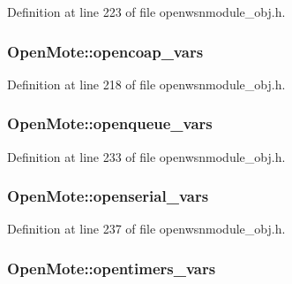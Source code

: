 Definition at line 223 of file openwsnmodule\+\_\+obj.\+h.

\subsubsection[{\texorpdfstring{opencoap\+\_\+vars}{opencoap_vars}}]{ Open\+Mote\+::opencoap\+\_\+vars}\hypertarget{struct_open_mote_ab5bab0ddb3925a9e553328506c80c6ce}{}\label{struct_open_mote_ab5bab0ddb3925a9e553328506c80c6ce}


Definition at line 218 of file openwsnmodule\+\_\+obj.\+h.

\subsubsection[{\texorpdfstring{openqueue\+\_\+vars}{openqueue_vars}}]{ Open\+Mote\+::openqueue\+\_\+vars}\hypertarget{struct_open_mote_a386f53172313c33476c0fb5de4daf54e}{}\label{struct_open_mote_a386f53172313c33476c0fb5de4daf54e}


Definition at line 233 of file openwsnmodule\+\_\+obj.\+h.

\subsubsection[{\texorpdfstring{openserial\+\_\+vars}{openserial_vars}}]{ Open\+Mote\+::openserial\+\_\+vars}\hypertarget{struct_open_mote_afd8c3a10c7a45dd24412299494f22dfd}{}\label{struct_open_mote_afd8c3a10c7a45dd24412299494f22dfd}


Definition at line 237 of file openwsnmodule\+\_\+obj.\+h.

\subsubsection[{\texorpdfstring{opentimers\+\_\+vars}{opentimers_vars}}]{ Open\+Mote\+::opentimers\+\_\+vars}\hypertarget{struct_open_mote_ad90befaa4329ea1edce6ca5c2697e8b1}{}\label{struct_open_mote_ad90befaa4329ea1edce6ca5c2697e8b1}



